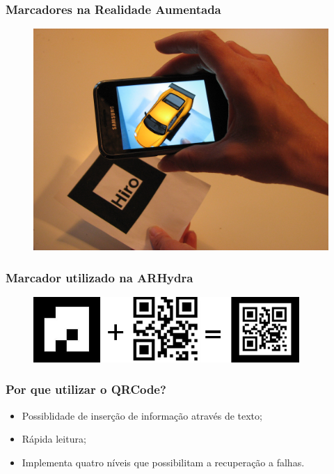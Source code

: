 \documentclass{beamer}
\begin{document}
	\begin{frame}
		\frametitle{Marcadores na Realidade Aumentada}
			
		\begin{figure}[h]
			\centering \includegraphics[scale=.07]{figuras/carro.jpg}
		\end{figure}
	\end{frame}
	
	\begin{frame}
		\frametitle{Marcador utilizado na ARHydra}
		\begin{figure}[htb]
			\begin{center}
					\includegraphics[width=0.9\textwidth]{figuras/marcador_arhydra.png}
			\end{center}
		\end{figure}
	\end{frame}
	
	\begin{frame}
		\frametitle{Por que utilizar o QRCode?}
		\begin{itemize}
		  \item Possiblidade de inserção de informação através de texto;
		  \item Rápida leitura;
		  \item Implementa quatro níveis que possibilitam a recuperação a falhas.
		\end{itemize}
	\end{frame}
	
\end{document}
